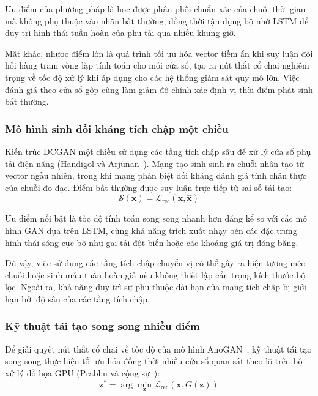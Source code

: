 Ưu điểm của phương pháp là học được phân phối chuẩn xác của chuỗi thời gian mà không phụ thuộc vào nhãn bất thường, đồng thời tận dụng bộ nhớ LSTM để duy trì hình thái tuần hoàn của phụ tải qua nhiều khung giờ.

Mặt khác, nhược điểm lớn là quá trình tối ưu hóa vector tiềm ẩn khi suy luận đòi hỏi hàng trăm vòng lặp tính toán cho mỗi cửa sổ, tạo ra nút thắt cổ chai nghiêm trọng về tốc độ xử lý khi áp dụng cho các hệ thống giám sát quy mô lớn. Việc đánh giá theo cửa sổ gộp cũng làm giảm độ chính xác định vị thời điểm phát sinh bất thường.

\subsubsection{Mô hình sinh đối kháng tích chập một chiều}

Kiến trúc DCGAN một chiều sử dụng các tầng tích chập sâu để xử lý cửa sổ phụ tải điện năng (Handigol và Arjunan~\cite{handigol2025}). Mạng tạo sinh sinh ra chuỗi nhân tạo từ vector ngẫu nhiên, trong khi mạng phân biệt đối kháng đánh giá tính chân thực của chuỗi đo đạc. Điểm bất thường được suy luận trực tiếp từ sai số tái tạo:
\begin{equation*}
    \mathcal{S}(\mathbf{x}) = \mathcal{L}_{\mathrm{rec}}(\mathbf{x}, \hat{\mathbf{x}})
\end{equation*}

Ưu điểm nổi bật là tốc độ tính toán song song nhanh hơn đáng kể so với các mô hình GAN dựa trên LSTM, cùng khả năng trích xuất nhạy bén các đặc trưng hình thái sóng cục bộ như gai tải đột biến hoặc các khoảng giá trị đóng băng.

Dù vậy, việc sử dụng các tầng tích chập chuyển vị có thể gây ra hiện tượng méo chuỗi hoặc sinh mẫu tuần hoàn giả nếu không thiết lập cẩn trọng kích thước bộ lọc. Ngoài ra, khả năng duy trì sự phụ thuộc dài hạn của mạng tích chập bị giới hạn bởi độ sâu của các tầng tích chập.

\subsubsection{Kỹ thuật tái tạo song song nhiều điểm}

Để giải quyết nút thắt cổ chai về tốc độ của mô hình AnoGAN~\cite{anogan}, kỹ thuật tái tạo song song thực hiện tối ưu hóa đồng thời nhiều cửa sổ quan sát theo lô trên bộ xử lý đồ họa GPU (Prabhu và cộng sự~\cite{prabhu2024}):
\begin{equation*}
    \mathbf{z}^* = \arg\min_{\mathbf{z}} \mathcal{L}_{\mathrm{rec}}\!\left(\mathbf{x}, G(\mathbf{z})\right)
\end{equation*}


